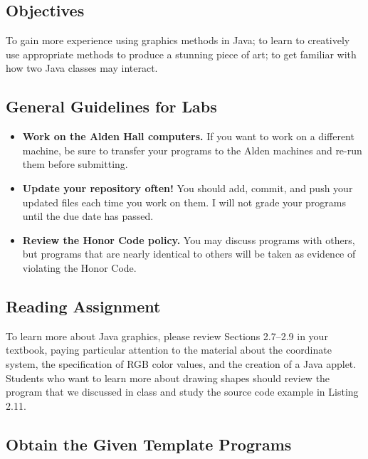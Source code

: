 



\subsection*{Objectives}
\vspace{-0.05in}

To gain more experience using graphics methods in Java; to learn to creatively use appropriate methods to produce a
stunning piece of art; to get familiar with how two Java classes may interact.

\subsection*{General Guidelines for Labs}
\vspace{-0.05in}
\begin{itemize}
\item
{\bf Work on the Alden Hall computers.} If you want to work on a different
machine, be sure to transfer your programs to the Alden
machines and re-run them before submitting.
\item
{\bf Update your repository often!} You should add, commit,
and push your updated files each time you work on them.  I will not grade
your programs until the due date has passed.
\item
{\bf Review the Honor Code policy.} You
may discuss programs with others, but programs that are nearly identical
to others will be taken as evidence of violating the Honor Code.
\end{itemize}

\subsection*{Reading Assignment}
\vspace{-0.05in}

To learn more about Java graphics, please review Sections 2.7--2.9 in your textbook, paying particular attention to the
material about the coordinate system, the specification of RGB color values, and the creation of a Java applet. Students
who want to learn more about drawing shapes should review the program that we discussed in class and study the source
code example in Listing 2.11.

\subsection*{Obtain the Given Template Programs}
\vspace{-0.05in}

